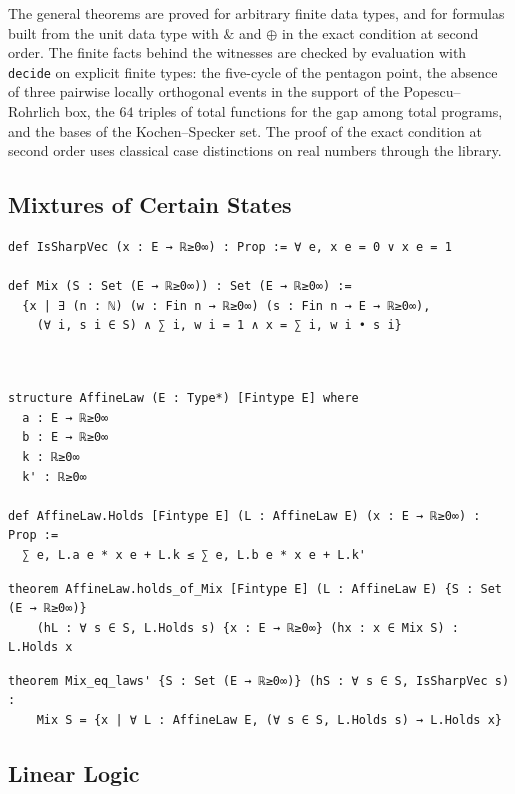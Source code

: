 The general theorems are proved for arbitrary finite data types, and
for formulas built from the unit data type with $\mathbin{\&}$ and
$\oplus$ in the exact condition at second order. The finite facts behind
the witnesses are checked by evaluation with \lstinline{decide} on
explicit finite types: the five-cycle of the pentagon point, the absence
of three pairwise locally orthogonal events in the support of the
Popescu--Rohrlich box, the $64$ triples of total functions for the gap
among total programs, and the bases of the Kochen--Specker set. The
proof of the exact condition at second order uses classical case
distinctions on real numbers through the library.

\subsection{Mixtures of Certain States}

\begin{lstlisting}
def IsSharpVec (x : E → ℝ≥0∞) : Prop := ∀ e, x e = 0 ∨ x e = 1

def Mix (S : Set (E → ℝ≥0∞)) : Set (E → ℝ≥0∞) :=
  {x | ∃ (n : ℕ) (w : Fin n → ℝ≥0∞) (s : Fin n → E → ℝ≥0∞),
    (∀ i, s i ∈ S) ∧ ∑ i, w i = 1 ∧ x = ∑ i, w i • s i}
\end{lstlisting}

\begin{lstlisting}


structure AffineLaw (E : Type*) [Fintype E] where
  a : E → ℝ≥0∞
  b : E → ℝ≥0∞
  k : ℝ≥0∞
  k' : ℝ≥0∞

def AffineLaw.Holds [Fintype E] (L : AffineLaw E) (x : E → ℝ≥0∞) : Prop :=
  ∑ e, L.a e * x e + L.k ≤ ∑ e, L.b e * x e + L.k'
\end{lstlisting}

\begin{lstlisting}
theorem AffineLaw.holds_of_Mix [Fintype E] (L : AffineLaw E) {S : Set (E → ℝ≥0∞)}
    (hL : ∀ s ∈ S, L.Holds s) {x : E → ℝ≥0∞} (hx : x ∈ Mix S) : L.Holds x
\end{lstlisting}

\begin{lstlisting}
theorem Mix_eq_laws' {S : Set (E → ℝ≥0∞)} (hS : ∀ s ∈ S, IsSharpVec s) :
    Mix S = {x | ∀ L : AffineLaw E, (∀ s ∈ S, L.Holds s) → L.Holds x}
\end{lstlisting}

\subsection{Linear Logic}

